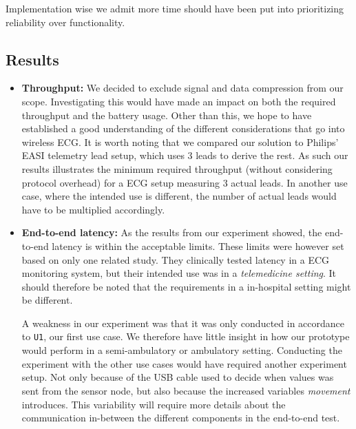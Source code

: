 Implementation wise we admit more time should have been put into prioritizing reliability over functionality.


\subsection{Results} %
\label{sub:results}


\begin{itemize}

  \item [] \textbf{Throughput:} We decided to exclude signal and data compression from our scope. Investigating this would have made an impact on both the required throughput and the battery usage. Other than this, we hope to have established a good understanding of the different considerations that go into wireless ECG. It is worth noting that we compared our solution to Philips' EASI telemetry lead setup, which uses 3 leads to derive the rest. As such our results illustrates the minimum required throughput (without considering protocol overhead) for a ECG setup measuring 3 actual leads. In another use case, where the intended use is different, the number of actual leads would have to be multiplied accordingly.
  \item [] \textbf{End-to-end latency:} As the results from our experiment showed, the end-to-end latency is within the acceptable limits. These limits were however set based on only one related study. They clinically tested latency in a ECG monitoring system, but their intended use was in a \emph{telemedicine setting}. It should therefore be noted that the requirements in a in-hospital setting might be different.
  
  A weakness in our experiment was that it was only conducted in accordance to \texttt{U1}, our first use case. We therefore have little insight in how our prototype would perform in a semi-ambulatory or ambulatory setting. Conducting the experiment with the other use cases would have required another experiment setup. Not only because of the USB cable used to decide when values was sent from the sensor node, but also because the increased variables \emph{movement} introduces. This variability will require more details about the communication in-between the different components in the end-to-end test. 
  

\end{itemize}
